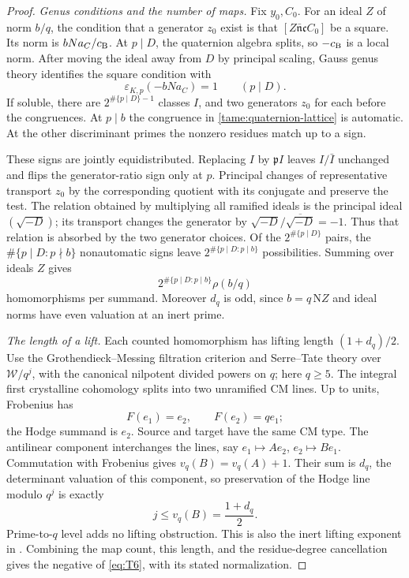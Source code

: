 \begin{proof}
\emph{Genus conditions and the number of maps.}
Fix \(y_0,C_0\). For an ideal \(Z\) of norm \(b/q\), the
condition that a generator \(z_0\) exist is that
\([Z\bar{\mathfrak n}\mathfrak cC_0]\) be a square.
Its norm is \(bNa_C/c_{\rm B}\). At \(p\mid D\), the quaternion
algebra splits, so \(-c_{\rm B}\) is a local norm.
After moving the ideal away from \(D\) by principal scaling,
Gauss genus theory identifies the square condition with
\[
 \varepsilon_{K,p}(-bNa_C)=1\qquad(p\mid D).
\]
If soluble, there are \(2^{\#\{p\mid D\}-1}\) classes \(I\), and
two generators \(z_0\) for each before the congruences.
At \(p\mid b\) the congruence in
\eqref{tame:quaternion-lattice} is automatic. At the other
discriminant primes the nonzero residues match up to a sign.

These signs are jointly equidistributed. Replacing \(I\) by
\(\mathfrak pI\) leaves \(I/\bar I\) unchanged and flips the
generator-ratio sign only at \(p\). Principal changes of
representative transport \(z_0\) by the corresponding quotient
with its conjugate and preserve the test. The relation obtained
by multiplying all ramified ideals is the principal ideal
\((\sqrt{-D})\); its transport changes the generator by
\(\sqrt{-D}/\overline{\sqrt{-D}}=-1\).
Thus that relation is absorbed by the two generator choices.
Of the \(2^{\#\{p\mid D\}}\) pairs, the
\(\#\{p\mid D:p\nmid b\}\) nonautomatic signs leave
\(2^{\#\{p\mid D:p\mid b\}}\) possibilities.
Summing over ideals \(Z\) gives
\[
 2^{\#\{p\mid D:p\mid b\}}\rho(b/q)
\]
homomorphisms per summand. Moreover \(d_q\) is odd, since
\(b=q\,\mathrm NZ\) and ideal norms have even valuation at
an inert prime.

\emph{The length of a lift.}
Each counted homomorphism has lifting length \((1+d_q)/2\).
Use the Grothendieck--Messing filtration criterion and
Serre--Tate theory over \(\mathcal W/q^j\), with the canonical
nilpotent divided powers on \(q\); here \(q\ge5\).
The integral first crystalline cohomology splits into two
unramified CM lines. Up to units, Frobenius has
\[
 F(e_1)=e_2,\qquad F(e_2)=qe_1;
\]
the Hodge summand is \(e_2\). Source and target have the same
CM type. The antilinear component interchanges the lines,
say \(e_1\mapsto Ae_2\), \(e_2\mapsto Be_1\).
Commutation with Frobenius gives \(v_q(B)=v_q(A)+1\).
Their sum is \(d_q\), the determinant valuation of this
component, so preservation of the Hodge line modulo \(q^j\)
is exactly
\[
 j\le v_q(B)=\frac{1+d_q}{2}.
\]
Prime-to-\(q\) level adds no lifting obstruction. This is also
the inert lifting exponent in
\cite[Corollary~7.15]{Conrad03}.
Combining the map count, this length, and the residue-degree
cancellation gives the negative of \eqref{eq:T6}, with its
stated normalization.
\end{proof}

